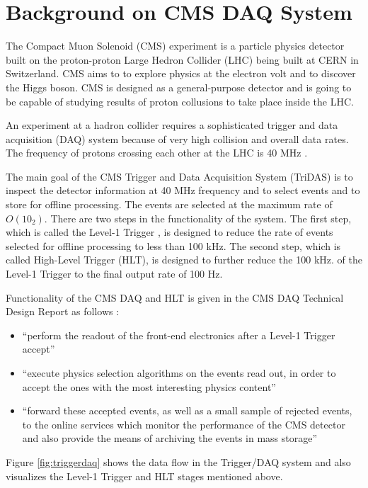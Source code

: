 \chapter{Background on CMS DAQ System}
\label{Chapter:DAQ}
The Compact Muon Solenoid (CMS) experiment is a particle physics detector built on the proton-proton Large Hedron Collider (LHC) being built at CERN in Switzerland. CMS aims to to explore physics at the electron volt and to discover the Higgs boson. CMS is designed as a general-purpose detector and is going to be capable of studying results of proton collusions to take place inside the LHC. 

An experiment at a hadron collider requires a sophisticated trigger and data acquisition (DAQ) system because of very high collision and overall data rates. The frequency of protons crossing each other at the LHC is 40 MHz \cite{CMSTDR}.

The main goal of the CMS Trigger and Data Acquisition System (TriDAS) is to inspect the detector information at 40 MHz frequency and to select events and to store for offline processing. The events are selected at the maximum rate of $O(10_{2})$. There are two steps in the functionality of the system. The first step, which is called the Level-1 Trigger \cite{CMSTDR}, is designed to reduce the rate of events selected for offline processing to less than 100 kHz. The second step, which is called High-Level Trigger (HLT), is designed to further reduce the 100 kHz. of the Level-1 Trigger to the final output rate of 100 Hz. 

Functionality of the CMS DAQ and HLT is given in the CMS DAQ Technical Design Report as follows \cite{CMSTDR}:

\begin{itemize}
	\item ``perform the readout of the front-end electronics after a Level-1 Trigger accept''
	\item ``execute physics selection algorithms on the events read out, in order to accept the ones with the most interesting physics content''
	\item ``forward these accepted events, as well as a small sample of rejected events, to the online services which monitor the performance of the CMS detector and also provide the means of archiving the events in mass storage''
\end{itemize}

Figure \ref{fig:triggerdaq} shows the data flow in the Trigger/DAQ system and also visualizes the Level-1 Trigger and HLT stages mentioned above.

